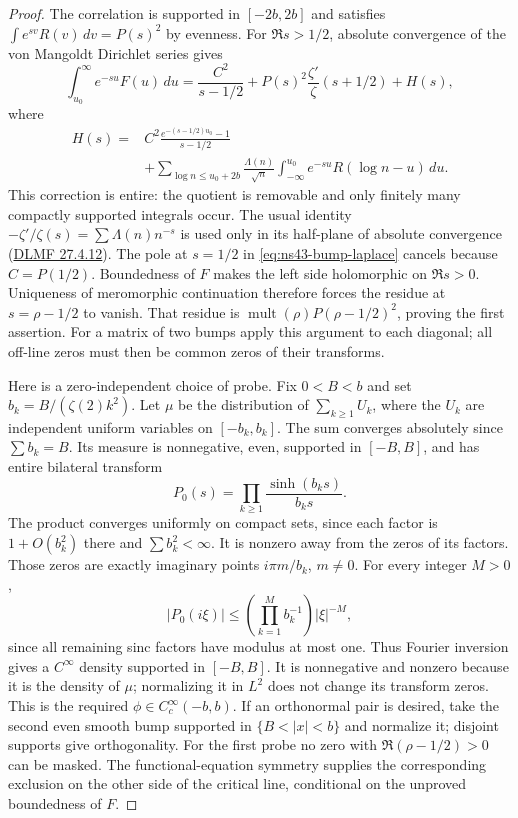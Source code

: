 \begin{proof}
The correlation is supported in $[-2b,2b]$ and satisfies
$\int e^{sv}R(v)\,dv=P(s)^2$ by evenness. For $\Re s>1/2$,
absolute convergence of the von Mangoldt Dirichlet series gives
\begin{equation}\label{eq:ns43-bump-laplace}
 \int_{u_0}^{\infty}e^{-su}F(u)\,du
 =\frac{C^2}{s-1/2}+P(s)^2\frac{\zeta'}{\zeta}(s+1/2)+H(s),
\end{equation}
where
\begin{align*}
 H(s)={}&C^2\frac{e^{-(s-1/2)u_0}-1}{s-1/2}\\
 &+\sum_{\log n\le u_0+2b}\frac{\Lambda(n)}{\sqrt n}
       \int_{-\infty}^{u_0}e^{-su}R(\log n-u)\,du.
\end{align*}
This correction is entire: the quotient is removable and only
finitely many compactly supported integrals occur. The usual
identity $-\zeta'/\zeta(s)=\sum\Lambda(n)n^{-s}$ is used only in
its half-plane of absolute convergence (\href{https://dlmf.nist.gov/27.4.E12}{DLMF 27.4.12}). The pole at $s=1/2$ in
\eqref{eq:ns43-bump-laplace} cancels because $C=P(1/2)$.
Boundedness of $F$ makes the left side holomorphic on $\Re s>0$.
Uniqueness of meromorphic continuation therefore forces the residue
at $s=\rho-1/2$ to vanish. That residue is
$\operatorname{mult}(\rho)P(\rho-1/2)^2$, proving the first assertion.
For a matrix of two bumps apply this argument to each diagonal;
all off-line zeros must then be common zeros of their transforms.

Here is a zero-independent choice of probe. Fix $0<B<b$ and set
$b_k=B/(\zeta(2)k^2)$. Let $\mu$ be the distribution of
$\sum_{k\ge1}U_k$, where the $U_k$ are independent uniform variables
on $[-b_k,b_k]$. The sum converges absolutely since $\sum b_k=B$.
Its measure is nonnegative, even, supported in $[-B,B]$, and has
entire bilateral transform
\[
 P_0(s)=\prod_{k\ge1}\frac{\sinh(b_ks)}{b_ks}.
\]
The product converges uniformly on compact sets, since each factor
is $1+O(b_k^2)$ there and $\sum b_k^2<\infty$. It is nonzero away
from the zeros of its factors. Those zeros are exactly imaginary
points $i\pi m/b_k$, $m\ne0$.
For every integer $M>0$,
\[
 |P_0(i\xi)|\le
 \left(\prod_{k=1}^M b_k^{-1}\right)|\xi|^{-M},
\]
since all remaining sinc factors have modulus at most one. Thus
Fourier inversion gives a $C^\infty$ density supported in $[-B,B]$.
It is nonnegative and nonzero because it is the density of $\mu$;
normalizing it in $L^2$ does not change its transform zeros. This is
the required $\phi\in C_c^\infty(-b,b)$. If an orthonormal pair is
desired, take the second even smooth bump supported in
$\{B<|x|<b\}$ and normalize it; disjoint supports give orthogonality.
For the first probe no zero with $\Re(\rho-1/2)>0$ can be masked.
The functional-equation symmetry supplies the corresponding exclusion
on the other side of the critical line, conditional on the unproved
boundedness of $F$.
\end{proof}

